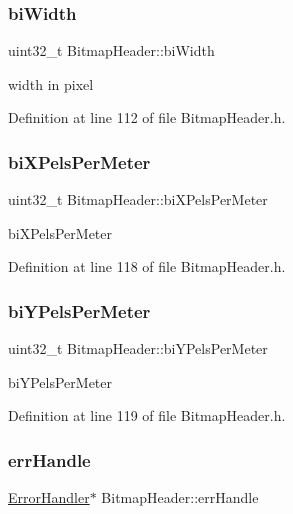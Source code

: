 \subsubsection{\texorpdfstring{biWidth}{biWidth}}
{\footnotesize\ttfamily uint32\+\_\+t Bitmap\+Header\+::bi\+Width\hspace{0.3cm}{\ttfamily [private]}}

width in pixel 

Definition at line 112 of file Bitmap\+Header.\+h.

\mbox{\label{classBitmapHeader_a1569e156f59c8a939c9d4b668ae41bcd}} 
\subsubsection{\texorpdfstring{biXPelsPerMeter}{biXPelsPerMeter}}
{\footnotesize\ttfamily uint32\+\_\+t Bitmap\+Header\+::bi\+X\+Pels\+Per\+Meter\hspace{0.3cm}{\ttfamily [private]}}

bi\+X\+Pels\+Per\+Meter 

Definition at line 118 of file Bitmap\+Header.\+h.

\mbox{\label{classBitmapHeader_a9f029a3b36773c4da51c18e0453213c7}} 
\subsubsection{\texorpdfstring{biYPelsPerMeter}{biYPelsPerMeter}}
{\footnotesize\ttfamily uint32\+\_\+t Bitmap\+Header\+::bi\+Y\+Pels\+Per\+Meter\hspace{0.3cm}{\ttfamily [private]}}

bi\+Y\+Pels\+Per\+Meter 

Definition at line 119 of file Bitmap\+Header.\+h.

\mbox{\label{classBitmapHeader_ab06f141245d592302dabe48571d12e32}} 
\subsubsection{\texorpdfstring{errHandle}{errHandle}}
{\footnotesize\ttfamily \mbox{\hyperlink{classErrorHandler}{Error\+Handler}}$\ast$ Bitmap\+Header\+::err\+Handle\hspace{0.3cm}{\ttfamily [private]}}



